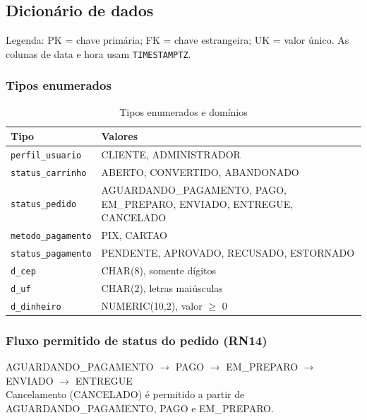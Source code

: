 \documentclass[12pt]{article}
\begin{document}
\subsection{Dicionário de dados}

Legenda: PK = chave primária; FK = chave estrangeira; UK = valor único. As colunas de data e hora usam \texttt{TIMESTAMPTZ}.



\subsubsection{Tipos enumerados}

\begin{table}[H]
\centering
\small
\renewcommand{\arraystretch}{1.25}
\begin{tabular}{|l|p{9cm}|}
\hline
\rowcolor{gray!40} \textbf{Tipo} & \textbf{Valores} \\ \hline
\texttt{perfil\_usuario} & CLIENTE, ADMINISTRADOR \\ \hline
\texttt{status\_carrinho} & ABERTO, CONVERTIDO, ABANDONADO \\ \hline
\texttt{status\_pedido} & AGUARDANDO\_PAGAMENTO, PAGO, EM\_PREPARO, ENVIADO, ENTREGUE, CANCELADO \\ \hline
\texttt{metodo\_pagamento} & PIX, CARTAO \\ \hline
\texttt{status\_pagamento} & PENDENTE, APROVADO, RECUSADO, ESTORNADO \\ \hline
\texttt{d\_cep} & CHAR(8), somente dígitos \\ \hline
\texttt{d\_uf} & CHAR(2), letras maiúsculas \\ \hline
\texttt{d\_dinheiro} & NUMERIC(10,2), valor $\geq$ 0 \\ \hline
\end{tabular}
\caption{Tipos enumerados e domínios}
\end{table}

\subsubsection{Fluxo permitido de status do pedido (RN14)}

\begin{center}
AGUARDANDO\_PAGAMENTO $\rightarrow$ PAGO $\rightarrow$ EM\_PREPARO $\rightarrow$ ENVIADO $\rightarrow$ ENTREGUE\\
\small Cancelamento (CANCELADO) é permitido a partir de AGUARDANDO\_PAGAMENTO, PAGO e EM\_PREPARO.
\end{center}
\end{document}

